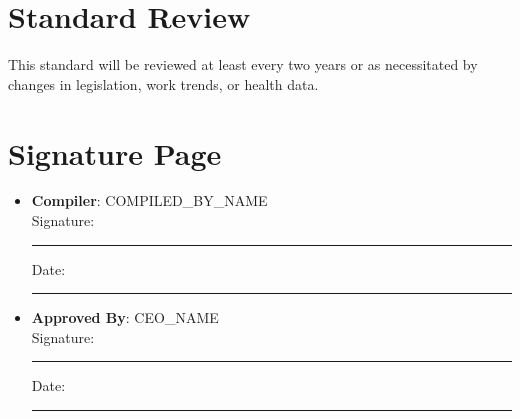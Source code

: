 \documentclass[11pt]{article}
\newcommand{\compilerName}{{{COMPILED_BY_NAME}}}
\begin{document}
\section{Standard Review}
This standard will be reviewed at least every two years or as necessitated by changes in legislation, work trends, or health data.

\section{Signature Page}
\begin{itemize}
  \item \textbf{Compiler}: \compilerName \\
    Signature: \rule{5cm}{0.4pt} \quad Date: \rule{3cm}{0.4pt}
  \item \textbf{Approved By}: {{CEO_NAME}} \\
    Signature: \rule{5cm}{0.4pt} \quad Date: \rule{3cm}{0.4pt}
\end{itemize}
\end{document}
